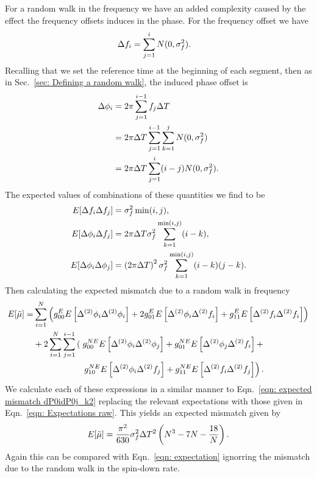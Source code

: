 For a random walk in the frequency we have an added complexity caused by the
effect the frequency offsets induces in the phase. For the frequency offset we
have
\begin{align}
\Delta f_{i} &= \sum_{j=1}^{i}N(0, \sigma_{f}^{2}).
\end{align}
Recalling that we set the reference time at the beginning of each segment,
then as in Sec.~\ref{sec: Defining a random walk}, the induced phase offset is
\begin{align}
\Delta\phi_{i} &=2\pi \sum_{j=1}^{i-1}f_{j}\Delta T \\
 & = 2\pi\Delta T \sum_{j=1}^{i-1}\sum_{k=1}^{j}N(0, \sigma_{f}^{2}) \\
& = 2\pi\Delta T \sum_{j=1}^{i}(i-j)N(0, \sigma_{f}^{2}).
\end{align}
The expected values of combinations of these quantities we find to be
\begin{align}
E[\Delta f_{i}\Delta f_{j}] & = \sigma_{f}^{2} \min(i, j), \\
E[\Delta\phi_{i}\Delta f_{j}] & = 2 \pi \Delta T \sigma_{f}^{2} \sum_{k=1}^{\min(i, j)}(i-k),\\
E[\Delta\phi_{i}\Delta\phi_{j}] & =
\left(2\pi\Delta T\right)^{2}\sigma_{f}^{2} \sum_{k=1}^{\min(i, j)}(i-k)(j-k).
\label{eqn: Expectations raw}
\end{align}
Then calculating the expected mismatch due to a random walk in frequency
\begin{align}
\begin{split}
E[\mutilde] = &
\s{i=1}{N}\left(g_{00}^{E}E\left[\Delta^{(2)}\phi_{i}\Delta^{(2)}\phi_{i}\right]
+ 2 g_{01}^{E}E\left[\Delta^{(2)}\phi_{i}\Delta^{(2)}\f_{i}\right]
+  g_{11}^{E} E\left[\Delta^{(2)}\f_{i}\Delta^{(2)}\f_{i}\right] \right) \\
& + 2\s{i=1}{N}\s{j=1}{i-1}\left(\right.
g_{00}^{NE}E\left[\Delta^{(2)}\phi_{i}\Delta^{(2)}\phi_{j}\right] +
g_{01}^{NE}E\left[\Delta^{(2)}\phi_{j}\Delta^{(2)}\f_{i}\right] +  \\
&\hspace{20mm}\left. g_{10}^{NE}E\left[\Delta^{(2)}\phi_{i}\Delta^{(2)}\f_{j}\right] +
g_{11}^{NE} E\left[\Delta^{(2)}\f_{i}\Delta^{(2)}\f_{j}\right] \right).
\end{split}
\end{align}
We calculate each of these expressions in a similar manner to Eqn.~\eqref{eqn:
expected mismatch dP0idP0j_k2} replacing the relevant expectations with those
given in Eqn.~\eqref{eqn: Expectations raw}. This yields an expected
mismatch given by
\begin{equation}
E[\tilde{\mu}] = \frac{\pi^{2} }{630} \sigma_{f}^{2} \Delta T^{2}  \left(N^{3} - 7N- \frac{18}{N} \right).
\label{eqn: Expected mismatch RW in frequency k2}
\end{equation}
Again this can be compared with Eqn.~\eqref{eqn: expectation} ignorring the
mismatch due to the random walk in the spin-down rate.

